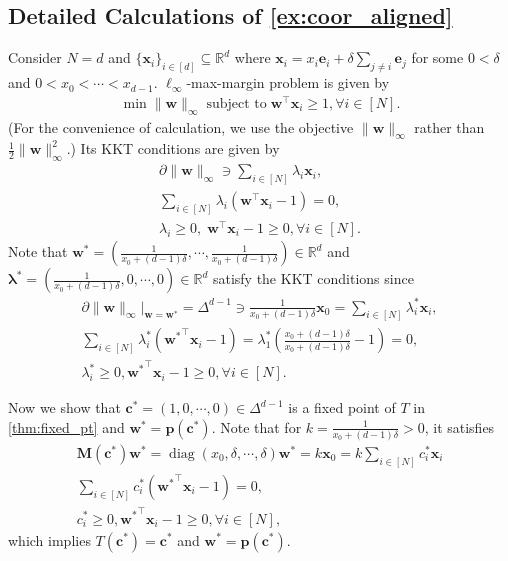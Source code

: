 \documentclass{article} %
\theoremstyle{plain}
\theoremstyle{definition}
\theoremstyle{remark}
\newcommand{\R}{\mathbb{R}}
\def\bx{{\mathbf x}}
\def\bc{{\mathbf c}}
\def\be{{\mathbf e}}
\def\bp{{\mathbf p}}
\def\bw{{\mathbf w}}
\def\bM{{\mathbf M}}
\DeclareMathOperator{\diag}{diag}
\begin{document}
\subsection[Detailed Calculations of Example \ref{ex:coor_aligned}]{Detailed Calculations of \cref{ex:coor_aligned}}
Consider $N=d$ and $\{\bx_i\}_{i \in [d]} \subseteq \R^d$ where $\bx_i = x_i \be_i + \delta \sum_{j \neq i} \be_j$ for some $0<\delta$ and $0 < x_0<\cdots<x_{d-1}$. $\ell_\infty$-max-margin problem is given by
    \begin{align*}
        \min \|\bw\|_\infty \; \text{subject to} \; \bw^\top \bx_i \geq 1, \forall i \in [N].
    \end{align*}
(For the convenience of calculation, we use the objective $\|\bw\|_\infty$ rather than $\frac{1}{2}\|\bw\|_\infty^2$.) Its KKT conditions are given by
    \begin{align*}
        \partial \|\bw\|_\infty \ni \sum_{i \in [N]} \lambda_i \bx_i, \\
        \sum_{i \in [N]} \lambda_i(\bw^\top \bx_i -1) = 0,\\
        \lambda_i\geq0, \; {\bw}^\top\bx_i-1 \geq 0, \forall i \in [N].
    \end{align*}
    Note that $\bw^* = (\frac{1}{x_0+(d-1)\delta}, \cdots, \frac{1}{x_0+(d-1)\delta}) \in \R^d$ and $\boldsymbol{\lambda}^*=(\frac{1}{x_0+(d-1)\delta}, 0, \cdots ,0) \in \R^d$ satisfy the KKT conditions since
    \begin{align*}
        \partial \|\bw\|_\infty \Big|_{\bw=\bw^*} = \Delta^{d-1} \ni \frac{1}{x_0+(d-1)\delta}\bx_0 = \sum_{i \in [N]}\lambda_i^* \bx_i, \\
        \sum_{i \in [N]} \lambda_i^*({\bw^*}^\top \bx_i -1) = \lambda_1^* (\frac{x_0+(d-1)\delta}{x_0+(d-1)\delta}-1)=0,\\
        \lambda_i^* \geq 0, {\bw^*}^\top \bx_i-1 \geq 0, \forall i \in [N].
    \end{align*}

    Now we show that $\bc^*=(1, 0, \cdots, 0) \in \Delta^{d-1}$ is a fixed point of $T$ in \cref{thm:fixed_pt} and $\bw^*=\bp(\bc^*)$. Note that for $k=\frac{1}{x_0+(d-1)\delta}>0$, it satisfies
    \begin{align*}
        \bM(\bc^*) \bw^* = \diag(x_0, \delta, \cdots, \delta) \bw^* = k \bx_0 = k\sum_{i \in [N]} c_i^* \bx_i \\
        \sum_{i\in[N]}c_i^*({\bw^*}^\top \bx_i-1)=0, \\
        c_i^*\geq0, {\bw^*}^\top\bx_i-1 \geq 0, \forall i \in [N],
    \end{align*}
    which implies $T(\bc^*) = \bc^*$ and $\bw^*=\bp(\bc^*)$.
\end{document}
